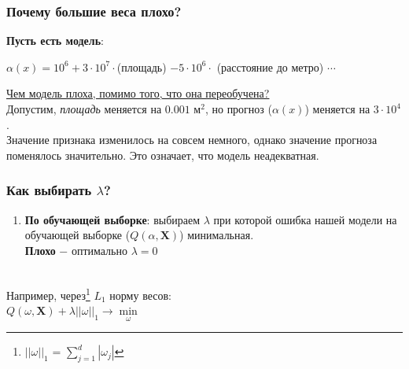 
        \subsubsection{Почему большие веса плохо?}
            \textbf{Пусть есть модель}:\\
            \begin{center}
                $\alpha(x) = 10^6 + 3\cdot10^7\cdot$(площадь) $ - 5\cdot10^6\cdot$ (расстояние до метро) $\cdots$
            \end{center}
            \underline{Чем модель плоха, помимо того, что она переобучена?}\\
            
            Допустим, \textit{площадь} меняется на $0.001$ м$^2$, но прогноз ($\alpha(x)$) меняется на $3 \cdot 10^4$.\\
            
            Значение признака изменилось на совсем немного, однако значение прогноза поменялось значительно. Это означает, что модель неадекватная.\\

        \subsubsection{Как выбирать $\lambda$?}
            \begin{enumerate}
                \item \textbf{По обучающей выборке}: выбираем $\lambda$ при которой ошибка нашей модели на обучающей выборке ($Q(\alpha, \mathbf{X})$) минимальная.\\
                \textbf{Плохо} $-$ оптимально $\lambda = 0$
                    
            \end{enumerate}

            \begin{center}
                \\
                Например, через\footnote{$||\omega||_1$ = $\sum\limits_{j=1}^d|\omega_j |$} $L_1$ норму весов:\\
                $Q(\omega, \mathbf{X}) + \lambda ||\omega||_1 \longrightarrow \min\limits_{\omega}$
            \end{center}


